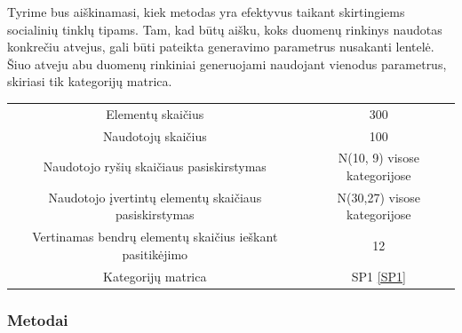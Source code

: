 \documentclass{VUMIFInfMagistrinis}
\begin{document}
Tyrime bus aiškinamasi, kiek metodas yra efektyvus taikant skirtingiems socialinių tinklų tipams. Tam, kad būtų aišku, koks duomenų rinkinys naudotas konkrečiu atvejus, gali būti pateikta generavimo parametrus nusakanti lentelė. Šiuo atveju abu duomenų rinkiniai generuojami naudojant vienodus parametrus, skiriasi tik kategorijų matrica.
\begin{center}
	\begin{tabular}{||c c||} 
		Elementų skaičius & 300 \\
		Naudotojų skaičius & 100 \\
		Naudotojo ryšių skaičiaus pasiskirstymas &  N(10, 9) visose kategorijose \\
		Naudotojo įvertintų elementų skaičiaus pasiskirstymas & N(30,27) visose kategorijose\\
		Vertinamas bendrų elementų skaičius ieškant pasitikėjimo & 12 \\
		Kategorijų matrica & SP1 \ref{SP1} \\
	\end{tabular}
	
\end{center}
\subsubsection{Metodai}
%
\end{document}
